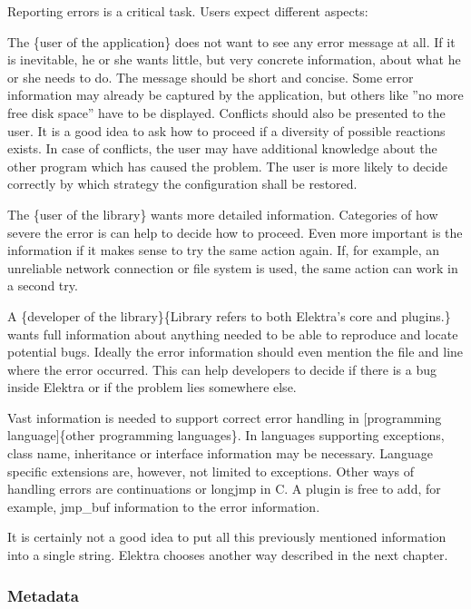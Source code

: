 Reporting errors is a critical task. Users expect different aspects\+:


\begin{DoxyItemize}
\item The \{user of the application\} does not want to see any error message at all. If it is inevitable, he or she wants little, but very concrete information, about what he or she needs to do. The message should be short and concise. Some error information may already be captured by the application, but others like ''no more free disk space'' have to be displayed. Conflicts should also be presented to the user. It is a good idea to ask how to proceed if a diversity of possible reactions exists. In case of conflicts, the user may have additional knowledge about the other program which has caused the problem. The user is more likely to decide correctly by which strategy the configuration shall be restored.
\item The \{user of the library\} wants more detailed information. Categories of how severe the error is can help to decide how to proceed. Even more important is the information if it makes sense to try the same action again. If, for example, an unreliable network connection or file system is used, the same action can work in a second try.
\item A \{developer of the library\}\{Library refers to both Elektra's core and plugins.\} wants full information about anything needed to be able to reproduce and locate potential bugs. Ideally the error information should even mention the file and line where the error occurred. This can help developers to decide if there is a bug inside Elektra or if the problem lies somewhere else.
\item Vast information is needed to support correct error handling in \mbox{[}programming language\mbox{]}\{other programming languages\}. In languages supporting exceptions, class name, inheritance or interface information may be necessary. Language specific extensions are, however, not limited to exceptions. Other ways of handling errors are continuations or {\ttfamily longjmp} in C. A plugin is free to add, for example, {\ttfamily jmp\+\_\+buf} information to the error information.
\end{DoxyItemize}

It is certainly not a good idea to put all this previously mentioned information into a single string. Elektra chooses another way described in the next chapter.

\subsubsection*{Metadata}

